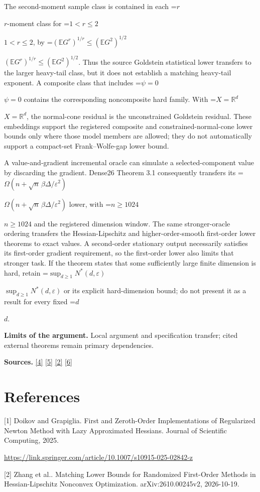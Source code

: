 \documentclass[10pt,a4paper]{article}
\newcommand{\AtlasMath}[1]{\par\begingroup\centering\setbox0=\hbox{$\displaystyle #1$}\ifdim\wd0>1.4\linewidth\typeout{ATLAS WIDE FORMULA: \the\wd0}\fi\ifdim\wd0>\linewidth\resizebox{\linewidth}{!}{\box0}\else\box0\fi\par\endgroup}
\newcommand{\AtlasInlineMath}[1]{\begingroup\setbox0=\hbox{$#1$}\ifdim\wd0>.4\linewidth\endgroup\AtlasMath{#1}\else\endgroup$#1$\fi}
\begin{document}
The second-moment sample class is contained in each \AtlasInlineMath{r}-moment class for \AtlasInlineMath{1<r\le2}, by \AtlasInlineMath{(\mathbb EG^r)^{1/r}\le(\mathbb EG^2)^{1/2}}. Thus the source Goldstein statistical lower transfers to the larger heavy-tail class, but it does not establish a matching heavy-tail exponent. A composite class that includes \AtlasInlineMath{\psi=0} contains the corresponding noncomposite hard family. With \AtlasInlineMath{X=\mathbb R^d}, the normal-cone residual is the unconstrained Goldstein residual. These embeddings support the registered composite and constrained-normal-cone lower bounds only where those model members are allowed; they do not automatically support a compact-set Frank--Wolfe-gap lower bound.

A value-and-gradient incremental oracle can simulate a selected-component value by discarding the gradient. Dense26 Theorem 3.1 consequently transfers its \AtlasInlineMath{\Omega(n+\sqrt n\,\beta\Delta/\varepsilon^2)} lower, with \AtlasInlineMath{n\ge1024} and the registered dimension window. The same stronger-oracle ordering transfers the Hessian-Lipschitz and higher-order-smooth first-order lower theorems to exact values. A second-order stationary output necessarily satisfies its first-order gradient requirement, so the first-order lower also limits that stronger task. If the theorem states that some sufficiently large finite dimension is hard, retain \AtlasInlineMath{\sup_{d\ge1}N^*(d,\varepsilon)} or its explicit hard-dimension bound; do not present it as a result for every fixed \AtlasInlineMath{d}.

\textbf{Limits of the argument.} Local argument and specification transfer; cited external theorems remain primary dependencies.

\textbf{Sources.} \href{https://arxiv.org/html/2610.19652v1}{[4]} \href{https://arxiv.org/html/2609.00045v3}{[5]} \href{https://arxiv.org/pdf/2610.00245v2}{[2]} \href{https://arxiv.org/html/2610.17074v1}{[6]}

\section{References}
[1] Doikov and Grapiglia. First and Zeroth-Order Implementations of Regularized Newton Method with Lazy Approximated Hessians. Journal of Scientific Computing, 2025.

\url{https://link.springer.com/article/10.1007/s10915-025-02842-z}

[2] Zhang et al.. Matching Lower Bounds for Randomized First-Order Methods in Hessian-Lipschitz Nonconvex Optimization. arXiv:2610.00245v2, 2026-10-19.
\end{document}
